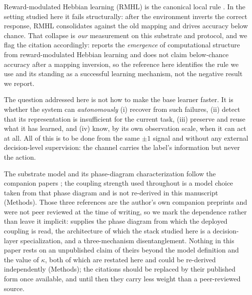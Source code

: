 \documentclass[preprint,12pt]{elsarticle}
\begin{document}
Reward-modulated Hebbian learning (RMHL) is the canonical local rule
\cite{hoerzer2014}. In the setting studied here it fails structurally: after
the environment inverts the correct response, RMHL consolidates against the
old mapping and drives accuracy below chance. That collapse is \emph{our}
measurement on this substrate and protocol, and we flag the citation
accordingly: \cite{hoerzer2014} reports the \emph{emergence} of computational
structure from reward-modulated Hebbian learning and does not claim
below-chance accuracy after a mapping inversion, so the reference here
identifies the rule we use and its standing as a successful learning mechanism,
not the negative result we report.

The question addressed here is not how to make the base
learner faster. It is whether the system can \emph{autonomously} (i) recover
from such failures, (ii) detect that its representation is insufficient for
the current task, (iii) preserve and reuse what it has learned, and (iv)
know, by its own observation scale, when it can act at all. All of this is to
be done from the same $\pm1$ signal and without any external
decision-level supervision: the channel carries the label's information
but never the action.

The substrate model
and its phase-diagram characterization follow the companion papers
\cite{companionA,companionB,companionC}; the coupling strength used
throughout is a model choice taken from that phase diagram and is not
re-derived in this manuscript (Methods). Those three references are the
author's own companion preprints and were not peer reviewed at the time of
writing, so we mark the dependence rather than leave it implicit:
\cite{companionA} supplies the phase diagram from which the deployed coupling is
read, \cite{companionB} the architecture of which the stack studied here is a
decision-layer specialization, and \cite{companionC} a three-mechanism
disentanglement. Nothing in this paper rests on an unpublished claim of theirs
beyond the model definition and the value of $\kappa$, both of which are
restated here and could be re-derived independently (Methods); the citations
should be replaced by their published form once available, and until then they
carry less weight than a peer-reviewed source.
\end{document}
